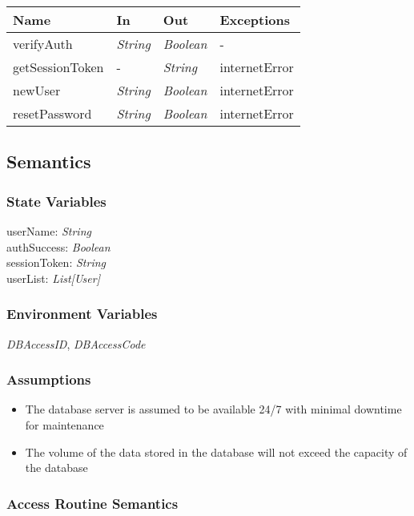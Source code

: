 \documentclass[12pt, titlepage]{article}
\begin{document}
\begin{center}
\begin{tabular}{p{4cm} p{3cm} p{3cm} p{3cm}}
\hline
\textbf{Name} & \textbf{In} & \textbf{Out} & \textbf{Exceptions} \\
\hline
verifyAuth&  \textit{String} & \textit{Boolean} & - \\
getSessionToken&  - & \textit{String} & internetError \\
newUser&  \textit{String} & \textit{Boolean} & internetError \\
resetPassword&  \textit{String} & \textit{Boolean} & internetError \\

\hline
\end{tabular}
\end{center}

\subsection{Semantics}

\subsubsection{State Variables}

userName: \textit{String}\\
authSuccess: \textit{Boolean}\\
sessionToken: \textit{String}\\
userList: \textit{List[User]}

\subsubsection{Environment Variables}

\textit{DBAccessID}, \textit{DBAccessCode}

\subsubsection{Assumptions}

\begin{itemize}
  \item The database server is assumed to be available 24/7 with minimal downtime for maintenance 
  \item The volume of the data stored in the database will not exceed the capacity of the database
\end{itemize}

\subsubsection{Access Routine Semantics}
\end{document}
